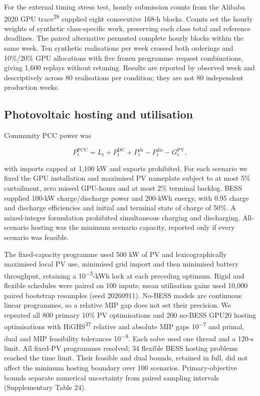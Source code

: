 \documentclass[10pt,a4paper]{article}
\begin{document}
For the external timing stress test, hourly submission counts from the Alibaba 2020 GPU trace\textsuperscript{28} supplied eight consecutive 168-h blocks. Counts set the hourly weights of synthetic class-specific work, preserving each class total and reference deadlines. The paired alternative permuted complete hourly blocks within the same week. Ten synthetic realisations per week crossed both orderings and 10\%/20\% GPU allocations with five frozen programme–request combinations, giving 1,600 replays without retuning. Results are reported by observed week and descriptively across 80 realisations per condition; they are not 80 independent production weeks.


\subsection*{Photovoltaic hosting and utilisation}

Community PCC power was


\begin{equation*}
P^{\mathrm{PCC}}_t=L_t+P^{\mathrm{DC}}_t+P^{\mathrm{ch}}_t-P^{\mathrm{dis}}_t-G^{\mathrm{PV}}_t,
\end{equation*}

with imports capped at 1,100 kW and exports prohibited. For each scenario we fixed the GPU installation and maximised PV nameplate subject to at most 5\% curtailment, zero missed GPU-hours and at most 2\% terminal backlog. BESS supplied 100-kW charge/discharge power and 200-kWh energy, with 0.95 charge and discharge efficiencies and initial and terminal state of charge of 50\%. A mixed-integer formulation prohibited simultaneous charging and discharging. All-scenario hosting was the minimum scenario capacity, reported only if every scenario was feasible.


The fixed-capacity programme used 500 kW of PV and lexicographically maximised local PV use, minimised grid import and then minimised battery throughput, retaining a 10\textsuperscript{−5}-kWh lock at each preceding optimum. Rigid and flexible schedules were paired on 100 inputs; mean utilisation gains used 10,000 paired bootstrap resamples (seed 20260911). No-BESS models are continuous linear programmes, so a relative MIP gap does not set their precision. We repeated all 800 primary 10\% PV optimisations and 200 no-BESS GPU20 hosting optimisations with HiGHS\textsuperscript{37} relative and absolute MIP gaps 10\textsuperscript{−7} and primal, dual and MIP feasibility tolerances 10\textsuperscript{−8}. Each solve used one thread and a 120-s limit. All fixed-PV programmes resolved; 34 flexible BESS hosting problems reached the time limit. Their feasible and dual bounds, retained in full, did not affect the minimum hosting boundary over 100 scenarios. Primary-objective bounds separate numerical uncertainty from paired sampling intervals (Supplementary Table 24).
\end{document}
